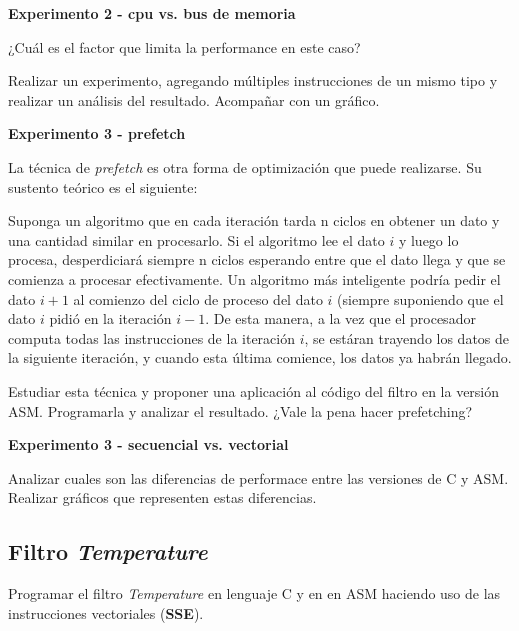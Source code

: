 
\newpage

\vspace*{0.3cm} \noindent
\textbf{Experimento 2 - cpu vs. bus de memoria}

	¿Cuál es el factor que limita la performance en este caso? 
	
	Realizar un experimento, agregando múltiples instrucciones de un mismo tipo
	y realizar un análisis 	del resultado. Acompañar con un gráfico.


\vspace*{0.3cm} \noindent
\textbf{Experimento 3 - prefetch}

  La técnica de \textit{prefetch} es otra forma de optimización que puede
  realizarse. Su sustento teórico es el siguiente:
  
  Suponga un algoritmo que en cada iteración tarda n ciclos en obtener un dato y una cantidad
  similar en procesarlo. Si el algoritmo lee el dato $i$ y luego lo procesa,
  desperdiciará siempre n ciclos esperando entre que el dato llega y que se comienza
  a procesar efectivamente. Un algoritmo más inteligente podría pedir el 
  dato $i+1$ al comienzo del ciclo de proceso del dato $i$ (siempre suponiendo
  que el dato $i$ pidió en la iteración $i-1$. De esta manera, a la vez que el
  procesador computa todas las instrucciones de la iteración $i$, se estáran trayendo
  los datos de la siguiente iteración, y cuando esta última comience, los datos ya
  habrán llegado.

  \vspace*{0.2cm}
  Estudiar esta técnica y proponer una aplicación al código del filtro en la versión ASM.
  Programarla y analizar el resultado. ¿Vale la pena hacer prefetching?

\vspace*{0.3cm} \noindent
\textbf{Experimento 3 - secuencial vs. vectorial}

  Analizar cuales son las diferencias de performace entre las versiones de C y ASM. 
  Realizar gráficos que representen estas diferencias.


\subsection*{Filtro \textit{Temperature}}

  Programar el filtro \textit{Temperature} en lenguaje C y en en ASM haciendo uso de 
  las instrucciones vectoriales (\textbf{SSE}).


